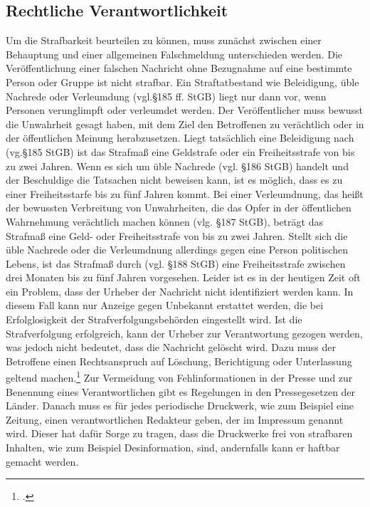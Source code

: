\documentclass[Thesis.tex]{subfiles}
\begin{document}
\subsection{Rechtliche Verantwortlichkeit}
Um die Strafbarkeit beurteilen zu können, muss zunächst zwischen einer Behauptung
 und einer allgemeinen Falschmeldung unterschieden werden. Die Veröffentlichung
einer falschen Nachricht ohne Bezugnahme auf eine bestimmte Person oder Gruppe
ist nicht strafbar. Ein Straftatbestand wie Beleidigung, üble Nachrede oder
Verleumdung (vgl.\S 185 ff. StGB)
liegt nur dann vor, wenn Personen verunglimpft oder verleumdet
werden. Der Veröffentlicher muss bewusst die Unwahrheit gesagt haben,
mit dem  Ziel den Betroffenen zu verächtlich oder in der öffentlichen
Meinung herabzusetzen.
Liegt tatsächlich eine Beleidigung nach (vg.\S 185 StGB) ist das Strafmaß eine Geldstrafe
oder ein Freiheitsstrafe von bis zu zwei Jahren. Wenn es sich um üble Nachrede (vgl. \S 186 StGB)
handelt und der Beschuldige die Tatsachen nicht beweisen kann, ist es möglich, dass es zu einer
Freiheitsstarfe bis zu fünf Jahren kommt. Bei einer Verleumdnung, das heißt der bewussten Verbreitung von Unwahrheiten,
die das Opfer in der öffentlichen Wahrnehmung verächtlich machen können (vlg. \S 187 StGB), beträgt das Strafmaß eine Geld-
oder Freiheitsstrafe von bis zu zwei Jahren. Stellt sich die üble Nachrede oder die Verleumdnung allerdings gegen eine Person
politischen Lebens, ist das Strafmaß durch (vgl. \S 188 StGB) eine Freiheitsstrafe zwischen drei Monaten bis zu fünf Jahren vorgesehen.
Leider ist es in der heutigen Zeit oft ein Problem, dass der Urheber der Nachricht nicht 
identifiziert werden kann. In diesem Fall kann nur Anzeige gegen Unbekannt 
erstattet werden, die bei Erfolglosigkeit der Strafverfolgungsbehörden eingestellt 
wird.
Ist die Strafverfolgung erfolgreich, kann der Urheber zur Verantwortung gezogen werden, was jedoch nicht bedeutet,
dass die Nachricht gelöscht wird. Dazu muss der Betroffene einen Rechtsanspruch auf Löschung,
 Berichtigung oder Unterlassung geltend machen.\footcite{DBWDUmgangmitFakenews} %
 Zur Vermeidung von Fehlinformationen in der Presse und zur Benennung eines
Verantwortlichen gibt es Regelungen in den Pressegesetzen der Länder.
Danach muss es für jedes periodische Druckwerk, wie zum Beispiel eine Zeitung,
einen verantwortlichen Redakteur geben, der im Impressum genannt wird. Dieser hat dafür
Sorge zu tragen, dass die Druckwerke frei von strafbaren Inhalten, wie zum Beispiel Desinformation,
sind, andernfalls kann er haftbar gemacht werden.
\end{document}
